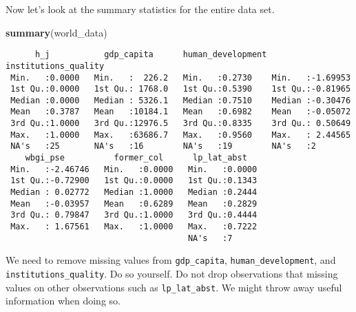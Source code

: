 \documentclass[]{article}
\newenvironment{Shaded}{\begin{snugshade}}{\end{snugshade}}
\newcommand{\KeywordTok}[1]{\textcolor[rgb]{0.13,0.29,0.53}{\textbf{#1}}}
\newcommand{\NormalTok}[1]{#1}
\newcommand{\OperatorTok}[1]{\textcolor[rgb]{0.81,0.36,0.00}{\textbf{#1}}}
\newcommand{\StringTok}[1]{\textcolor[rgb]{0.31,0.60,0.02}{#1}}
\begin{document}
Now let's look at the summary statistics for the entire data set.

\begin{Shaded}
\begin{Highlighting}[]
\KeywordTok{summary}\NormalTok{(world_data) }
\end{Highlighting}
\end{Shaded}

\begin{verbatim}
      h_j           gdp_capita      human_development institutions_quality
 Min.   :0.0000   Min.   :  226.2   Min.   :0.2730    Min.   :-1.69953    
 1st Qu.:0.0000   1st Qu.: 1768.0   1st Qu.:0.5390    1st Qu.:-0.81965    
 Median :0.0000   Median : 5326.1   Median :0.7510    Median :-0.30476    
 Mean   :0.3787   Mean   :10184.1   Mean   :0.6982    Mean   :-0.05072    
 3rd Qu.:1.0000   3rd Qu.:12976.5   3rd Qu.:0.8335    3rd Qu.: 0.50649    
 Max.   :1.0000   Max.   :63686.7   Max.   :0.9560    Max.   : 2.44565    
 NA's   :25       NA's   :16        NA's   :19        NA's   :2           
    wbgi_pse          former_col      lp_lat_abst    
 Min.   :-2.46746   Min.   :0.0000   Min.   :0.0000  
 1st Qu.:-0.72900   1st Qu.:0.0000   1st Qu.:0.1343  
 Median : 0.02772   Median :1.0000   Median :0.2444  
 Mean   :-0.03957   Mean   :0.6289   Mean   :0.2829  
 3rd Qu.: 0.79847   3rd Qu.:1.0000   3rd Qu.:0.4444  
 Max.   : 1.67561   Max.   :1.0000   Max.   :0.7222  
                                     NA's   :7       
\end{verbatim}

We need to remove missing values from \texttt{gdp\_capita}, \texttt{human\_development}, and \texttt{institutions\_quality}. Do so yourself. Do not drop observations that missing values on other observations such as \texttt{lp\_lat\_abst}. We might throw away useful information when doing so.

\begin{Shaded}
\end{Shaded}
\end{document}
